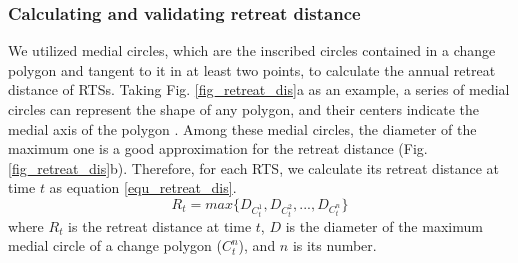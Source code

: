 \documentclass[authoryear,preprint,review,12pt]{elsarticle}
\begin{document}
\subsubsection{Calculating and validating retreat distance}
\label{sec_cal_retreat_dis}

We utilized medial circles, which are the inscribed circles contained in a change polygon and tangent to it in at least two points, to calculate the annual retreat distance of RTSs. 
Taking Fig. \ref{fig_retreat_dis}a as an example, a series of medial circles can represent the shape of any polygon, and their centers indicate the medial axis of the polygon \citep{zhu2014computing}. 
Among these medial circles, the diameter of the maximum one is a good approximation for the retreat distance (Fig. \ref{fig_retreat_dis}b).
Therefore, for each RTS, we calculate its retreat distance at time $t$ as equation \ref{equ_retreat_dis}.
\begin{equation}
R_t = max\{D_{C_t^1},D_{C_t^2},...,D_{C_t^n}\}
\label{equ_retreat_dis}
\end{equation}
where $R_t$ is the retreat distance at time $t$, $D$ is the diameter of the maximum medial circle of a change polygon ($C_t^n$), and $n$ is its number.
\end{document}
